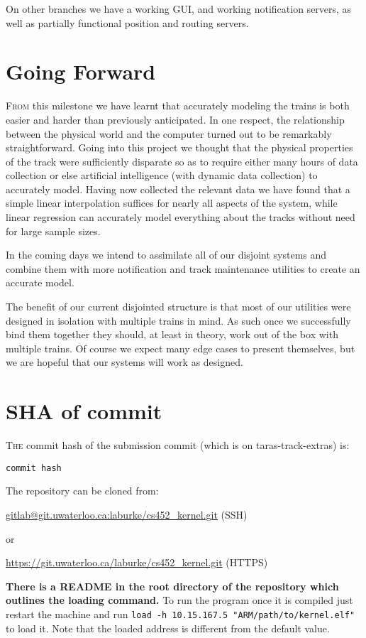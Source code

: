 \documentclass{article}
\begin{document}
On other branches we have a working GUI, and working notification servers, as
well as partially functional position and routing servers.

\section*{Going Forward}

\textsc{From} this milestone we have learnt that accurately modeling the trains
is both easier and harder than previously anticipated. In one respect, the
relationship between the physical world and the computer turned out to be
remarkably straightforward. Going into this project we thought that the physical
properties of the track were sufficiently disparate so as to require either many
hours of data collection or else artificial intelligence (with dynamic data
collection) to accurately model. Having now collected the relevant data we have
found that a simple linear interpolation suffices for nearly all aspects of the
system, while linear regression can accurately model everything about the tracks
without need for large sample sizes.

In the coming days we intend to assimilate all of our disjoint systems and
combine them with more notification and track maintenance utilities to create an
accurate model.

The benefit of our current disjointed structure is that most of our utilities
were designed in isolation with multiple trains in mind. As such once we
successfully bind them together they should, at least in theory, work out of the
box with multiple trains. Of course we expect many edge cases to present
themselves, but we are hopeful that our systems will work as designed.

\section*{SHA of commit}

\textsc{The} commit hash of the submission commit (which is on
taras-track-extras) is:

\texttt{{{{commit hash}}}}

\noindent The repository can be cloned from:

\url{gitlab@git.uwaterloo.ca:laburke/cs452_kernel.git} (SSH)

or

\url{https://git.uwaterloo.ca/laburke/cs452_kernel.git} (HTTPS)

\textbf{There is a README in the root directory of the repository which outlines
the loading command.} To run the program once it is compiled just restart the
machine and run \texttt{load -h 10.15.167.5
"ARM/path/to/kernel.elf"} to load it. Note that the loaded address is different
from the default value.
\end{document}
